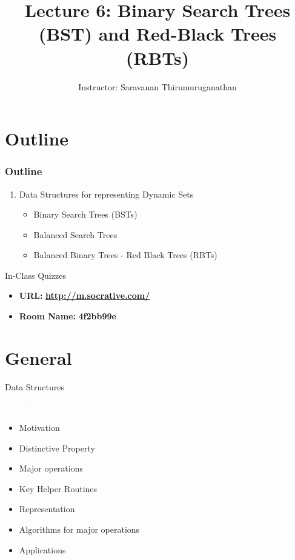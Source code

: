 \documentclass{beamer}
\title[Saravanan Thirumuruganathan] 
{Lecture 6: Binary Search Trees (BST) and Red-Black Trees (RBTs)}
\author[CSE 5311] 
{Instructor: Saravanan Thirumuruganathan}
\date[]
\newcommand{\tblue}[1]{{\Large {\textcolor{azure}{#1}}}}
\begin{document}
\begin{frame}
  \titlepage
\end{frame}


\section{Outline}

\begin{frame}
\frametitle {Outline}
\begin{enumerate}
\item Data Structures for representing Dynamic Sets
\begin{itemize}
    \item Binary Search Trees (BSTs)
    \item Balanced Search Trees
    \item Balanced Binary Trees - Red Black Trees (RBTs)
\end{itemize}
\end{enumerate}
\end{frame}

\begin{frame}{In-Class Quizzes}
\begin{itemize}
\item {\Large {\bf URL:}} {\LARGE \bf \url{http://m.socrative.com/}} 
\item {\Large {\bf Room Name:} {\LARGE \bf 4f2bb99e}}
\end{itemize}
\end{frame}

\section{General}

\begin{frame}{Data Structures}

\tblue{Key Things to Know for Data Structures}
\begin{itemize}
    \item Motivation
    \item Distinctive Property
    \item Major operations
    \item Key Helper Routines
    \item Representation
    \item Algorithms for major operations
    \item Applications
\end{itemize}
\end{frame}
\end{document}
